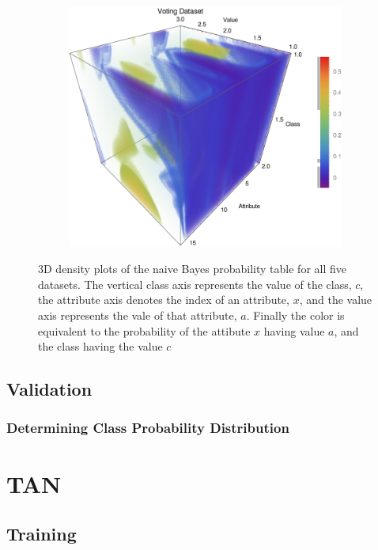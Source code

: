 \documentclass{article}
\begin{document}
\begin{figure}[h]
\begin{subfigure}[b]{0.49\textwidth}
				\end{subfigure} \	
				\begin{subfigure}[b]{0.49\textwidth}
					\centering
					\includegraphics[width=\textwidth]{figs/NaiveBayes/plot_ptable_vote}					
				\end{subfigure}
				\caption{3D density plots of the naive Bayes probability table for all five datasets. The vertical class axis represents the value of the class, $c$, the attribute axis denotes the index of an attribute, $x$, and the value axis represents the vale of that attribute, $a$. Finally the color is equivalent to the probability of the attibute $x$ having value $a$, and the class having the value $c$}
				\label{ptable}
			\end{figure}
		
	\subsection{Validation}
		\subsubsection{Determining Class Probability Distribution}
\section{TAN}
	\subsection{Training}
\end{document}
